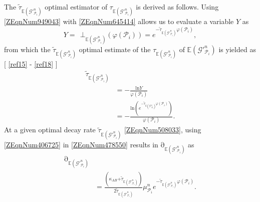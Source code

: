 \documentclass[11pt]{article}%
\newcommand*{\cref}[1]{%
  \begingroup
    \hypersetup{
      linkcolor=linkequation,
      linkbordercolor=linkequation,
    }%
    \ref{#1}%
  \endgroup
}
\begin{document}
 The ${\widetilde{\tau }}_{\mathbb{E}\left({\mathcal{G}}'^n_{{\mathcal{P}}_i}\right)}$ optimal estimator of ${\tau }_{\mathbb{E}\left({\mathcal{G}}'^n_{{\mathcal{P}}_i}\right)}$ is derived as follows. Using \eqref{ZEqnNum949043} with \eqref{ZEqnNum645414} allows us to evaluate a variable $Y$ as
\begin{equation} \label{29)} 
Y\mathrm{=\ \ }{\mathrm{\bot }}_{\mathbb{E}\left({\mathcal{G}}'^n_{{\mathcal{P}}_i}\right)}\left(\varphi \left({\mathcal{P}}_i\right)\right)\mathrm{=}e^{\mathrm{-}{\widetilde{\tau }}_{\mathbb{E}\left({\mathcal{G}}'^n_{{\mathcal{P}}_i}\right)}\varphi \left({\mathcal{P}}_i\right)},                                                           
\end{equation} 
from which the ${\widetilde{\tau }}_{\mathbb{E}\left({\mathcal{G}}'^n_{{\mathcal{P}}_i}\right)}$ optimal estimate of the ${\tau }_{\mathbb{E}\left({\mathcal{G}}'^n_{{\mathcal{P}}_i}\right)}$ of $\mathbb{E}\left({\mathcal{G}}'^n_{{\mathcal{P}}_i}\right)$ is yielded as [\cref{ref15}-\cref{ref18}]
\begin{equation} \label{ZEqnNum508033} 
\begin{split}
{\widetilde{\tau }}_{\mathbb{E}\left({\mathcal{G}}'^n_{{\mathcal{P}}_i}\right)}\\&\mathrm{=-}\frac{\mathrm{ln}Y}{\varphi \left({\mathcal{P}}_i\right)}\\&\mathrm{=-}\frac{\mathrm{ln}\left(e^{\mathrm{-}{\widetilde{\tau }}_{\mathbb{E}\left({\mathcal{G}}'^n_{{\mathcal{P}}_i}\right)}\varphi \left({\mathcal{P}}_i\right)}\right)}{\varphi \left({\mathcal{P}}_i\right)}.                                                          
\end{split}
\end{equation} 
At a given optimal decay rate ${\widetilde{\tau }}_{\mathbb{E}\left({\mathcal{G}}'^n_{{\mathcal{P}}_i}\right)}$ \eqref{ZEqnNum508033}, using \eqref{ZEqnNum406725} in \eqref{ZEqnNum478550} results in ${\mathrm{\partial }}_{\mathbb{E}\left({\mathcal{G}}'^n_{{\mathcal{P}}_i}\right)}$ as 
\begin{equation} \label{31)} 
\begin{split}
{\mathrm{\partial }}_{\mathbb{E}\left({\mathcal{G}}'^n_{{\mathcal{P}}_i}\right)}\\&\mathrm{=}\frac{\left({\kappa }_{AB}\mathrm{+}{\widetilde{\tau }}_{\mathbb{E}\left({\mathcal{G}}'^n_{{\mathcal{P}}_i}\right)}\right)}{\mathrm{2}{\widetilde{\tau }}_{\mathbb{E}\left({\mathcal{G}}'^n_{{\mathcal{P}}_i}\right)}}{\mu }^n_{{\mathcal{P}}_i}e^{\mathrm{-}{\widetilde{\tau }}_{\mathbb{E}\left({\mathcal{G}}'^n_{{\mathcal{P}}_i}\right)}\varphi \left({\mathcal{P}}_i\right)}.                                                            
\end{split}
\end{equation} 
 
\end{document}

